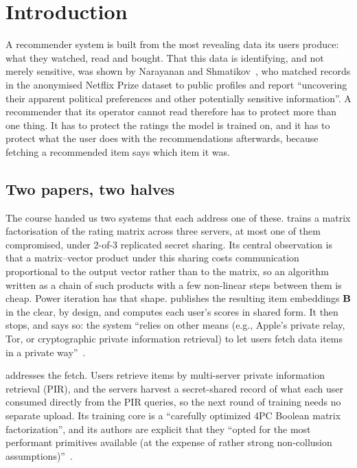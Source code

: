 \section{Introduction}
\label{sec:intro}

A recommender system is built from the most revealing data its users produce:
what they watched, read and bought. That this data is identifying, and not
merely sensitive, was shown by Narayanan and Shmatikov~\cite{narayanan2008}, who
matched records in the anonymised Netflix Prize dataset to public profiles and
report ``uncovering their apparent political preferences and other potentially
sensitive information''. A recommender that its operator cannot read therefore
has to protect more than one thing. It has to protect the ratings the model is
trained on, and it has to protect what the user does with the recommendations
afterwards, because fetching a recommended item says which item it was.

\subsection{Two papers, two halves}
\label{sec:intro:gap}

The course handed us two systems that each address one of these. \nudge{}
trains a matrix factorisation of the rating matrix across three servers, at most
one of them compromised, under 2-of-3 replicated secret sharing. Its central
observation is that a matrix--vector product under this sharing costs
communication proportional to the output vector rather than to the matrix, so an
algorithm written as a chain of such products with a few non-linear steps
between them is cheap. Power iteration has that shape. \nudgeplain{} publishes
the resulting item embeddings $\mathbf{B}$ in the clear, by design, and computes
each user's scores in shared form. It then stops, and says so: the system
``relies on other means (e.g., Apple's private relay, Tor, or cryptographic
private information retrieval) to let users fetch data items in a private
way''~\cite{nudge2026}.

\pirsona{} addresses the fetch. Users retrieve items by multi-server private
information retrieval (PIR), and the servers harvest a secret-shared record of
what each user consumed directly from the PIR queries, so the next round of
training needs no separate upload. Its training core is a ``carefully optimized
4PC Boolean matrix factorization'', and its authors are explicit that they
``opted for the most performant primitives available (at the expense of rather
strong non-collusion assumptions)''~\cite{pirsona2021}.

